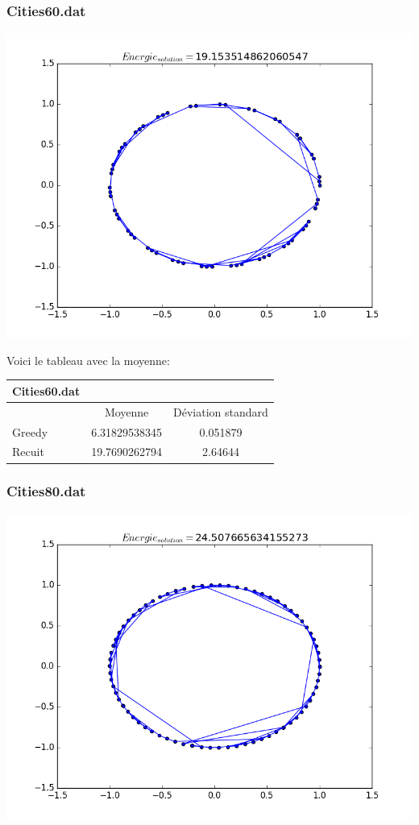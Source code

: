 \documentclass[a4paper, 11pt]{article}
\begin{document}
\subsubsection{Cities60.dat}
\includegraphics[scale=0.75]{cities60}

Voici le tableau avec la moyenne:\\
\begin{tabular}{|l | c |c |}
\hline
Cities60.dat & & \\
\hline
  & Moyenne & Déviation standard\\
  \hline
Greedy & 6.31829538345	 & 0.051879\\
\hline
Recuit & 19.7690262794	 & 2.64644\\
\hline
\end{tabular}

\subsubsection{Cities80.dat}
\includegraphics[scale=0.75]{cities80}
\end{document}
